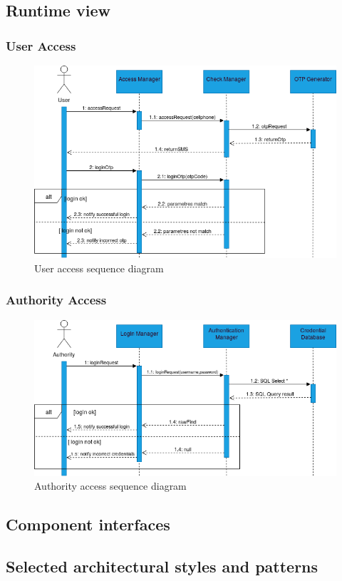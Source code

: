 \newpage

\subsection{Runtime view}
\subsubsection{User Access}
	\begin{figure}[H]
		\includegraphics[width=\textwidth]{Images/RunTimeViewUserAccess.png}		
		\caption{\label{fig:UserAccess}User access sequence diagram}
	\end{figure}
\subsubsection{Authority Access}
	\begin{figure}[H]
		\includegraphics[width=\textwidth]{Images/RunTimeViewAuthorityAccess.png}
		\caption{\label{fig:AuthorityAccess}Authority access sequence diagram}	
	\end{figure}
\subsection{Component interfaces}

\subsection{Selected architectural styles and patterns}